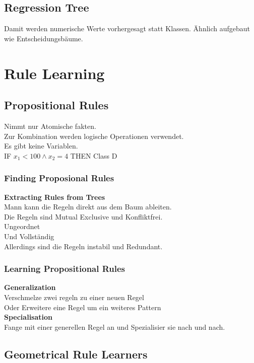 \documentclass[a4paper]{scrartcl}
\begin{document}
 \subsection{Regression Tree}
 Damit werden numerische Werte vorhergesagt statt Klassen.
 Ähnlich aufgebaut wie Entscheidungsbäume.
 
 \section{Rule Learning}
 \subsection{Propositional Rules}
 Nimmt nur Atomische fakten.\\
 Zur Kombination werden logische Operationen verwendet.\\
 Es gibt keine Variablen.\\
 
 IF $x_1 < 100 \wedge x_2 = 4$ THEN Class D\\
 \subsubsection{Finding Proposional Rules}
 \textbf{Extracting Rules from Trees}\\
 Mann kann die Regeln direkt aus dem Baum ableiten.\\
 Die Regeln sind Mutual Exclusive und Konfliktfrei.\\
 Ungeordnet\\
 Und Vollständig\\
 Allerdings sind die Regeln instabil und Redundant.\\
 
 \subsubsection{Learning Propositional Rules}
 \textbf{Generalization}\\
 Verschmelze zwei regeln zu einer neuen Regel\\
 Oder Erweitere eine Regel um ein weiteres Pattern\\
 \textbf{Specialisation}\\
 Fange mit einer generellen Regel an und Spezialisier sie nach und nach.\\
 
 \subsection{Geometrical Rule Learners}
\end{document}
